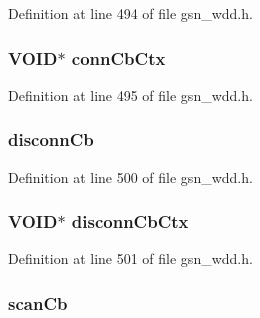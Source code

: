 Definition at line 494 of file gsn\_\-wdd.h.

\hypertarget{a00281_a18b517961e54813325f90a7cbba1c174}{
\subsubsection[{connCbCtx}]{\setlength{\rightskip}{0pt plus 5cm}VOID$\ast$ {\bf connCbCtx}}}
\label{a00281_a18b517961e54813325f90a7cbba1c174}


Definition at line 495 of file gsn\_\-wdd.h.

\hypertarget{a00281_aacc4bc86e2332e539eafec82d0c45c24}{
\subsubsection[{disconnCb}]{ {\bf disconnCb}}}
\label{a00281_aacc4bc86e2332e539eafec82d0c45c24}


Definition at line 500 of file gsn\_\-wdd.h.

\hypertarget{a00281_a8d8fc7a1a7805470fbd3bbeb9493df94}{
\subsubsection[{disconnCbCtx}]{\setlength{\rightskip}{0pt plus 5cm}VOID$\ast$ {\bf disconnCbCtx}}}
\label{a00281_a8d8fc7a1a7805470fbd3bbeb9493df94}


Definition at line 501 of file gsn\_\-wdd.h.

\hypertarget{a00281_aa057e756ab3cf48ccebfd3c66f40a280}{
\subsubsection[{scanCb}]{ {\bf scanCb}}}
\label{a00281_aa057e756ab3cf48ccebfd3c66f40a280}


